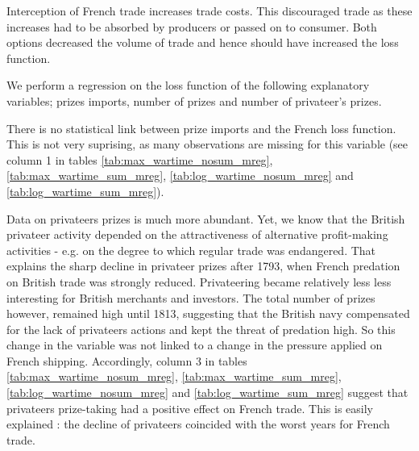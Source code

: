 \documentclass[12pt,a4paper,notitlepage,english]{article}
\begin{document}
Interception of French trade increases trade costs.
This discouraged trade as these increases had to be absorbed by producers or passed on to consumer.
Both options decreased the volume of trade and hence should have increased the loss function.



We perform a regression on the loss function of the following explanatory variables; prizes imports, number of prizes and number of privateer's prizes. 

There is no statistical link between prize imports and the French loss function. This is not very suprising, as many observations are missing for this variable (see column 1 in tables \ref{tab:max_wartime_nosum_mreg},  \ref{tab:max_wartime_sum_mreg}, \ref{tab:log_wartime_nosum_mreg} and   \ref{tab:log_wartime_sum_mreg}).





Data on privateers prizes is much more abundant.
Yet, we know that the British privateer activity depended on the attractiveness of alternative profit-making activities \citep[p. 673]{Villiers1991,Hillmann2011} - e.g. on the degree to which regular trade was endangered. That explains the sharp decline in privateer prizes after 1793, when French predation on British trade was strongly reduced.
Privateering became relatively less less interesting for British merchants and investors.
The total number of prizes however, remained high until 1813, suggesting that the British navy compensated for the lack of privateers actions and kept the threat of predation high.
So this change in the variable was not linked to a change in the pressure applied on French shipping.
Accordingly, column 3 in tables  \ref{tab:max_wartime_nosum_mreg},  \ref{tab:max_wartime_sum_mreg}, \ref{tab:log_wartime_nosum_mreg} and   \ref{tab:log_wartime_sum_mreg}  suggest that privateers prize-taking had a positive effect on French trade.
This is easily explained : the decline of privateers coincided with the worst years for French trade.
\end{document}
